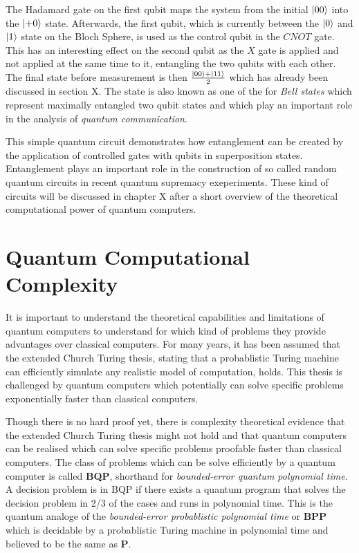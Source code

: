 The Hadamard gate on the first qubit maps the system from the initial $\Ket{00}$
into the $\Ket{+0}$ state. Afterwards, the first qubit, which is currently
between the $\Ket{0}$ and $\Ket{1}$ state on the Bloch Sphere, is used as the
control qubit in the $CNOT$ gate. This has an interesting effect on the second qubit
as the $X$ gate is applied and not applied at the same time to it, entangling
the two qubits with each other. The final state before measurement is then
$\frac{\Ket{00} + \Ket{11}}{2}$ which has already been discussed in section X.
The state is also known as one of the for \textit{Bell states} which represent maximally
entangled two qubit states and which play an important role in the analysis of
\textit{quantum communication}.

This simple quantum circuit demonstrates how entanglement can be created by the
application of controlled gates with qubits in superposition states.
Entanglement plays an important role in the construction of so called random
quantum circuits in recent quantum supremacy exeperiments. These kind of circuits will
be discussed in chapter X after a short overview of the theoretical
computational power of quantum computers.


\section{Quantum Computational Complexity}

It is important to understand the theoretical capabilities and limitations of quantum computers to understand for which kind of problems
they provide advantages over classical computers. For many years, it has been
assumed that the extended Church Turing thesis, stating that a probablistic
Turing machine can efficiently simulate any realistic model of computation,
holds. This thesis is challenged by quantum computers which potentially can
solve specific problems exponentially faster than classical computers.

Though there is no hard proof yet, there is complexity theoretical evidence that the
extended Church Turing thesis might not hold and that quantum computers can be
realised which can solve specific problems proofable faster than classical
computers. The class of problems which can be solve efficiently by a quantum
computer is called \textbf{BQP}, shorthand for \textit{bounded-error quantum
  polynomial time}. A decision problem is in BQP if there exists a quantum
program that solves the decision problem in 2/3 of the cases and runs in
polynomial time. This is the quantum analoge of the \textit{bounded-error
  probablistic polynomial time} or \textbf{BPP} which is decidable by a
probablistic Turing machine in polynomial time and believed to be the same as
\textbf{P}.

